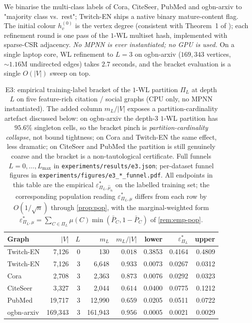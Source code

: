 \documentclass[10pt]{article}
\theoremstyle{definition}
\theoremstyle{remark}
\newcommand{\eps}{\varepsilon}
\begin{document}
We binarise the multi-class labels of Cora, CiteSeer, PubMed and
ogbn-arxiv to "majority class vs.\ rest"; Twitch-EN ships a
native binary mature-content flag. The initial colour
$h_{v}^{(0)}$ is the vertex degree (consistent with Theorem~1 of
\citet{morris2019wl}); each refinement round is one pass of the
$1$-WL multiset hash, implemented with sparse-CSR adjacency.
\emph{No MPNN is ever instantiated; no GPU is used.} On a single
laptop core, WL refinement to $L = 3$ on ogbn-arxiv
($169{,}343$ vertices, $\sim 1.16\mathrm{M}$ undirected edges)
takes $2.7$ seconds, and the bracket evaluation is a single
$O(\lvert V\rvert)$ sweep on top.

\begin{table}[h]\centering\small
\begin{tabular}{lrrrrrrr}
\toprule
Graph & $\lvert V\rvert$ & $L$ & $m_{L}$ & $m_{L}/|V|$ & lower
      & $\eps^{*}_{\Pi_{L}}$ & upper \\
\midrule
Twitch-EN  & 7{,}126   & 0 &     130 & $0.018$ & 0.3853 & 0.4164 & 0.4809 \\
Twitch-EN  & 7{,}126   & 3 &   6{,}648 & $0.933$ & 0.0073 & 0.0267 & 0.0312 \\
Cora       & 2{,}708   & 3 &   2{,}363 & $0.873$ & 0.0076 & 0.0292 & 0.0323 \\
CiteSeer   & 3{,}327   & 3 &   2{,}044 & $0.614$ & 0.0400 & 0.0775 & 0.1212 \\
PubMed     & 19{,}717  & 3 &  12{,}990 & $0.659$ & 0.0205 & 0.0511 & 0.0722 \\
ogbn-arxiv & 169{,}343 & 3 & 161{,}943 & $\mathbf{0.956}$ & 0.0005 & 0.0021 & 0.0029 \\
\bottomrule
\end{tabular}
\caption{E3: empirical training-label bracket of the $1$-WL
partition $\Pi_{L}$ at depth $L$ on five feature-rich citation /
social graphs (CPU only, no MPNN instantiated). The added column
$m_{L}/|V|$ exposes a partition-cardinality artefact discussed
below: on ogbn-arxiv the depth-$3$ $1$-WL partition has
$95.6\%$ singleton cells, so the bracket pinch is
\emph{partition-cardinality collapse}, not bound tightness; on
Cora and Twitch-EN the same effect, less dramatic; on CiteSeer
and PubMed the partition is still genuinely coarse and the
bracket is a non-tautological certificate. Full funnels
$L = 0, \ldots, L_{\max}$ in
\texttt{experiments/results/e3.json}; per-dataset funnel
figures in \texttt{experiments/figures/e3\_*\_funnel.pdf}.
All endpoints in this table are the empirical
$\eps^{*}_{\Pi_{L},\hat\mu_{n}}$ on the labelled training set;
the corresponding population reading
$\eps^{*}_{\Pi_{L},\mu}$ differs from each row by $O(1/\sqrt n)$
through \cref{prop:pop}, with the marginal-weighted form
$\eps^{*}_{\Pi_{L},\mu} = \sum_{C \in \Pi_{L}}
\mu(C)\min(\bar P_{C}, 1-\bar P_{C})$ of \cref{rem:emp-pop}.}
\label{tab:e3}
\end{table}
\end{document}
